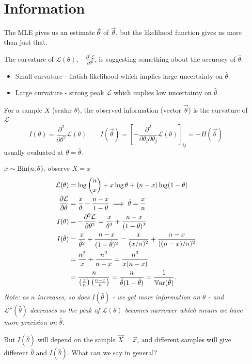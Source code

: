 \documentclass[10pt, a4paper]{article}
\begin{document}
\section{Information}

The MLE gives us an estimate $\hvec{\theta}$ of $\vec{\theta}$,
but the likelihood function gives us more than just that.

The curvature of $\mathcal{L}(\theta)$,
$-\frac{\partial ^ 2\mathcal{L}}{\partial \theta ^ 2}$,
is suggesting something about the accuracy of $\hat{\theta}$:
\begin{itemize}
    \item Small curvature -
    flatish likelihood which implies large uncertainty on $\hat{\theta}$.
    
    \item Large curvature -
    strong peak $\mathcal{L}$ which implies low uncertainty on $\hat{\theta}$.
\end{itemize}

\begin{definition}
    For a sample $X$
    (scalar $\theta$),
    the observed information
    (vector $\vec{\theta}$)
    is the curvature of $\mathcal{L}$
    \[
    I(\theta) = \frac{\partial ^ 2}{\partial \theta ^ 2}\mathcal{L}(\theta)\qquad I(\vec{\theta}) = \left[-\frac{\partial ^ 2}{\partial \theta_i\partial \theta_j}\mathcal{L}(\theta)\right]_{ij} = -H(\vec{\theta})
    \]
    usually evaluated at $\theta = \hat{\theta}$.
\end{definition}

\begin{example}
    $x \sim \Bin(n, \theta)$,
    observe $X = x$
    \begin{align*}
        \mathcal{L}(\theta) &= \log{\binom{n}{x}} + x\log{\theta} + (n - x)\log(1 - \theta) \\
        \pd[\mathcal{L}]{\theta} &= \frac{x}{\theta} - \frac{n - x}{1 - \theta} \implies \hat{\theta} = \frac{x}{n} \\
        I(\theta) &= -\frac{\partial ^ 2\mathcal{L}}{\partial \theta ^ 2} = \frac{x}{\theta ^ 2} + \frac{n - x}{(1 - \theta) ^ 2} \\
        I(\hat{\theta}) &= \frac{x}{\hat{\theta} ^ 2} + \frac{n - x}{(1 - \hat{\theta}) ^ 2} = \frac{x}{(x / n) ^ 2} + \frac{n - x}{((n - x) / n) ^ 2} \\
        &= \frac{n ^ 2}{x} + \frac{n ^ 2}{n - x} = \frac{n ^ 3}{x(n - x)} \\
        &= \frac{n}{\left(\frac{x}{n}\right)\left(\frac{n - x}{n}\right)} = \frac{n}{\hat{\theta}(1 - \hat{\theta})} = \frac{1}{\Var(\hat{\theta})}.
    \end{align*}
    \textit{Note:
    as $n$ increases,
    so does $I(\hat{\theta})$ -
    we get more information on $\theta$ -
    and $\mathcal{L}''(\hat{\theta})$ decreases so the peak of $\mathcal{L}(\theta)$ becomes narrower which means we have more precision on $\hat{\theta}$.}

    But $I(\hat{\theta})$ will depend on the sample $\vec{X} = \vec{x}$,
    and different samples will give different $\hat{\theta}$ and $I(\hat{\theta})$.
    What can we say in general?
\end{example}
\end{document}
